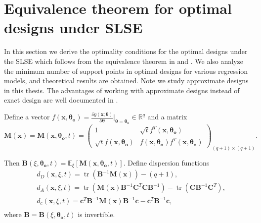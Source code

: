 \documentclass[
]{book}
\theoremstyle{definition}
\theoremstyle{definition}
\theoremstyle{definition}
\theoremstyle{definition}
\theoremstyle{remark}
\begin{document}
\section{Equivalence theorem for optimal designs under SLSE}\label{equivalence-theorem-for-optimal-designs-under-slse}

In this section we derive the optimality conditions for the optimal designs under the SLSE which follows from the equivalence theorem in \citet{kiefer-wolfowitz1959optimum} and \citet{kiefer1974general}. We also analyze the minimum number of support points in optimal designs for various regression models, and theoretical results are obtained. Note we study approximate designs in this thesis. The advantages of working with approximate designs instead of exact design are well documented in \citet{kiefer1985jack}.

Define a vector \(f(\boldsymbol{x,\theta_o})=\frac{\partial g(\boldsymbol{x};\boldsymbol{\theta})}{ \partial \boldsymbol{\theta}}\Big|_{\boldsymbol{\theta}=\boldsymbol{\theta_o}} \in \mathbb{R}^q\) and a matrix
\begin{equation}
\boldsymbol{M}(\boldsymbol{x})=\boldsymbol{M}(\boldsymbol{x},\boldsymbol{\theta_o},t)=\begin{pmatrix}
1       &   \sqrt{t}f^T(\boldsymbol{x},\boldsymbol{\theta_o})\\
\sqrt{t}f(\boldsymbol{x},\boldsymbol{\theta_o}) &f(\boldsymbol{x},\boldsymbol{\theta_o})f^T(\boldsymbol{x},\boldsymbol{\theta_o})
\end{pmatrix}_{(q+1)\times (q+1)}.
 \label{eq:M-matrix}
\end{equation}

Then \(\boldsymbol{B}(\xi,\boldsymbol{\theta_o},t)=\mathbb{E}_{\xi}[\boldsymbol{M}(\boldsymbol{x},\boldsymbol{\theta_o},t)]\). Define dispersion functions
\begin{equation} \label{fuction:dispersion}
\begin{aligned}
  &d_D(\boldsymbol{x},\xi,t) = \operatorname{tr}(\boldsymbol{B}^{-1}\boldsymbol{M}(\boldsymbol{x}))-(q+1),\\
  &d_A(\boldsymbol{x},\xi,t) = \operatorname{tr}(\boldsymbol{M}(\boldsymbol{x})\boldsymbol{B}^{-1}\boldsymbol{C}^T\boldsymbol{C}\boldsymbol{B}^{-1})-\operatorname{tr}(\boldsymbol{C}\boldsymbol{B}^{-1}\boldsymbol{C}^T),\\
  &d_c(\boldsymbol{x},\xi,t) = \boldsymbol{c}^T\boldsymbol{B}^{-1}\boldsymbol{M}(\boldsymbol{x})\boldsymbol{B}^{-1}\boldsymbol{c}-\boldsymbol{c}^T\boldsymbol{B}^{-1}\boldsymbol{c},\\
\end{aligned}
\end{equation}
where \(\boldsymbol{B}=\boldsymbol{B}(\xi,\boldsymbol{\theta_o},t)\) is invertible.
\end{document}
